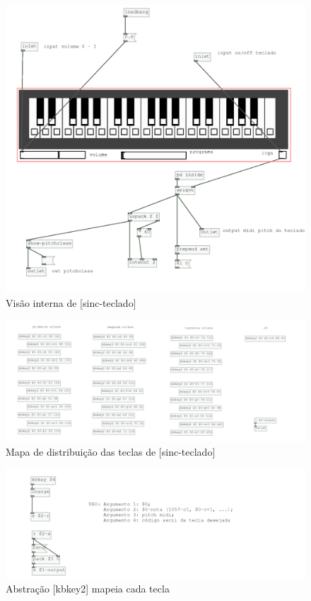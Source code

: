 \documentclass{ppgmus}
\begin{document}
\begin{figure}
\includegraphics[scale=.5]{sinc-teclado-interno}
\caption{Visão interna de [sinc-teclado]}
\label{sinc-teclado-interno}
\end{figure}

\begin{figure}
\includegraphics[scale=.5]{sinc-teclado-mapa}
\caption{Mapa de distribuição das teclas de [sinc-teclado]}
\label{sinc-teclado-mapa}
\end{figure}

\begin{figure}
\includegraphics[scale=.5]{kbbey2}
\caption{Abstração [kbkey2] mapeia cada tecla}
\label{kbbey2}
\end{figure}
\end{document}
